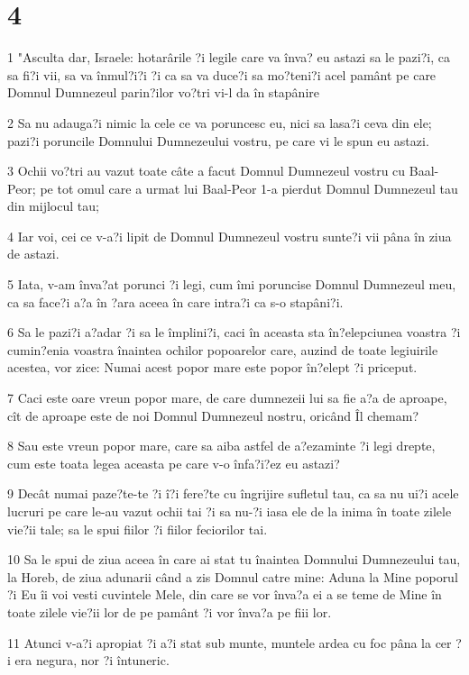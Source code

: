 \chapter{4}

\par 1 "Asculta dar, Israele: hotarârile ?i legile care va înva? eu astazi sa le pazi?i, ca sa fi?i vii, sa va înmul?i?i ?i ca sa va duce?i sa mo?teni?i acel pamânt pe care Domnul Dumnezeul parin?ilor vo?tri vi-l da în stapânire
\par 2 Sa nu adauga?i nimic la cele ce va poruncesc eu, nici sa lasa?i ceva din ele; pazi?i poruncile Domnului Dumnezeului vostru, pe care vi le spun eu astazi.
\par 3 Ochii vo?tri au vazut toate câte a facut Domnul Dumnezeul vostru cu Baal-Peor; pe tot omul care a urmat lui Baal-Peor 1-a pierdut Domnul Dumnezeul tau din mijlocul tau;
\par 4 Iar voi, cei ce v-a?i lipit de Domnul Dumnezeul vostru sunte?i vii pâna în ziua de astazi.
\par 5 Iata, v-am înva?at porunci ?i legi, cum îmi poruncise Domnul Dumnezeul meu, ca sa face?i a?a în ?ara aceea în care intra?i ca s-o stapâni?i.
\par 6 Sa le pazi?i a?adar ?i sa le împlini?i, caci în aceasta sta în?elepciunea voastra ?i cumin?enia voastra înaintea ochilor popoarelor care, auzind de toate legiuirile acestea, vor zice: Numai acest popor mare este popor în?elept ?i priceput.
\par 7 Caci este oare vreun popor mare, de care dumnezeii lui sa fie a?a de aproape, cît de aproape este de noi Domnul Dumnezeul nostru, oricând Îl chemam?
\par 8 Sau este vreun popor mare, care sa aiba astfel de a?ezaminte ?i legi drepte, cum este toata legea aceasta pe care v-o înfa?i?ez eu astazi?
\par 9 Decât numai paze?te-te ?i î?i fere?te cu îngrijire sufletul tau, ca sa nu ui?i acele lucruri pe care le-au vazut ochii tai ?i sa nu-?i iasa ele de la inima în toate zilele vie?ii tale; sa le spui fiilor ?i fiilor feciorilor tai.
\par 10 Sa le spui de ziua aceea în care ai stat tu înaintea Domnului Dumnezeului tau, la Horeb, de ziua adunarii când a zis Domnul catre mine: Aduna la Mine poporul ?i Eu îi voi vesti cuvintele Mele, din care se vor înva?a ei a se teme de Mine în toate zilele vie?ii lor de pe pamânt ?i vor înva?a pe fiii lor.
\par 11 Atunci v-a?i apropiat ?i a?i stat sub munte, muntele ardea cu foc pâna la cer ?i era negura, nor ?i întuneric.
